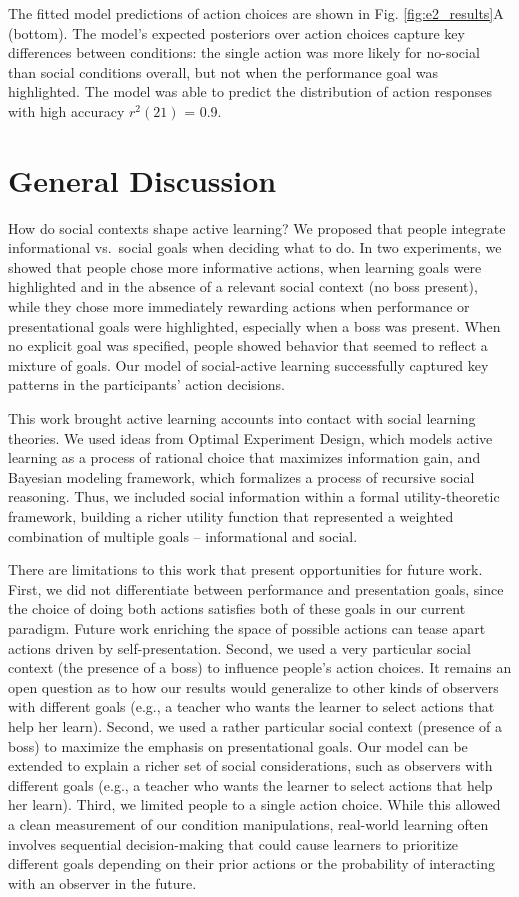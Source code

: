 \documentclass[10pt, letterpaper]{article}
\begin{document}
The fitted model predictions of action choices are shown in Fig.
\ref{fig:e2_results}A (bottom). The model's expected posteriors over
action choices capture key differences between conditions: the single
action was more likely for no-social than social conditions overall, but
not when the performance goal was highlighted. The model was able to
predict the distribution of action responses with high accuracy
\(r^2(21)\) = 0.9.

\section{General Discussion}\label{general-discussion}

How do social contexts shape active learning? We proposed that people
integrate informational vs.~social goals when deciding what to do. In
two experiments, we showed that people chose more informative actions,
when learning goals were highlighted and in the absence of a relevant
social context (no boss present), while they chose more immediately
rewarding actions when performance or presentational goals were
highlighted, especially when a boss was present. When no explicit goal
was specified, people showed behavior that seemed to reflect a mixture
of goals. Our model of social-active learning successfully captured key
patterns in the participants' action decisions.

This work brought active learning accounts into contact with social
learning theories. We used ideas from Optimal Experiment Design, which
models active learning as a process of rational choice that maximizes
information gain, and Bayesian modeling framework, which formalizes a
process of recursive social reasoning. Thus, we included social
information within a formal utility-theoretic framework, building a
richer utility function that represented a weighted combination of
multiple goals -- informational and social.

There are limitations to this work that present opportunities for future
work. First, we did not differentiate between performance and
presentation goals, since the choice of doing both actions satisfies
both of these goals in our current paradigm. Future work enriching the
space of possible actions can tease apart actions driven by
self-presentation. Second, we used a very particular social context (the
presence of a boss) to influence people's action choices. It remains an
open question as to how our results would generalize to other kinds of
observers with different goals (e.g., a teacher who wants the learner to
select actions that help her learn). Second, we used a rather particular
social context (presence of a boss) to maximize the emphasis on
presentational goals. Our model can be extended to explain a richer set
of social considerations, such as observers with different goals (e.g.,
a teacher who wants the learner to select actions that help her learn).
Third, we limited people to a single action choice. While this allowed a
clean measurement of our condition manipulations, real-world learning
often involves sequential decision-making that could cause learners to
prioritize different goals depending on their prior actions or the
probability of interacting with an observer in the future.
\end{document}
